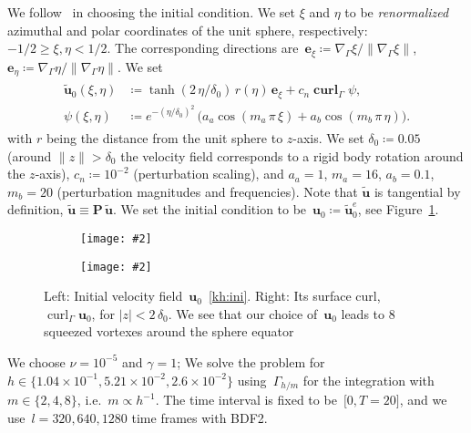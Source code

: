 \documentclass[12pt]{article}
\newcommand{\includegraphicsw}[2][1.]{\texttt{[image: \#2]}}
\newcommand{\vect}[1]{\boldsymbol{\mathbf{#1}}}
\DeclareMathOperator{\Curl}{curl}
\DeclareMathOperator{\vCurl}{\vect{curl}}
\begin{document}
We follow~\cite{lederer2019divergence} in choosing the initial condition. We set $\xi$ and $\eta$ to be \textit{renormalized} azimuthal and polar coordinates of the unit sphere, respectively: $-1/2 \ge \xi, \eta < 1/2$. The corresponding directions are~$\vect e_\xi \coloneqq \nabla_{\Gamma}\xi/\|\nabla_{\Gamma}\xi\|$, $\vect e_\eta \coloneqq \nabla_{\Gamma}\eta/\|\nabla_{\Gamma}\eta\|$. We set
\begin{align}\begin{split} \label{kh:ini}
	\tilde{\vect u}_0(\xi, \eta) &\coloneqq \tanh(2\,\eta/\delta_0)\,r(\eta)\,\vect e_\xi + c_n\vCurl_\Gamma\psi, \\
	\psi(\xi, \eta) &\coloneqq e^{-(\eta/\delta_0)^2}\,\big(a_a\cos(m_a\,\pi\,\xi) + a_b\cos(m_b\,\pi\,\eta)\big).
\end{split}\end{align}
with $r$ being the distance from the unit sphere to $z$-axis. We set $\delta_0 \coloneqq 0.05$ (around $\|z\| > \delta_0$ the velocity field corresponds to a rigid body rotation around the $z$-axis), $c_n \coloneqq 10^{-2}$ (perturbation scaling), and $a_a = 1$, $m_a = 16$, $a_b = 0.1$, $m_b = 20$ (perturbation magnitudes and frequencies). Note that $\tilde{\vect u}$ is tangential by definition, $\tilde{\vect u} \equiv \vect P\,\tilde{\vect u}$. We set the initial condition to be~$\vect u_0 \coloneqq \tilde{\vect u}_0^e$, see Figure~\ref{fig:kh:ini}.

\begin{figure}[H]
	\par\bigskip
	\centering
	\begin{subfigure}{.35\linewidth}
		\centering
		\includegraphicsw[.95]{{kh_ini_u_8.cropped}.png}
	\end{subfigure}%
	\begin{subfigure}{.65\linewidth}
		\centering
		\includegraphicsw[.95]{{kh_ini_w_8.cropped}.png}
	\end{subfigure}%
	\caption{Left: Initial velocity field~$\vect u_0$~\eqref{kh:ini}. Right: Its surface curl, $\Curl_\Gamma \vect u_0$, for $|z| < 2\,\delta_0$. We see that our choice of~$\vect u_0$ leads to 8 squeezed vortexes around the sphere equator}
	\label{fig:kh:ini}		
\end{figure}

We choose $\nu = 10^{-5}$ and $\gamma = 1$; We solve the problem for~$h \in \{1.04\times 10^{-1}, 5.21\times 10^{-2}, 2.6\times 10^{-2}\}$ using~$\Gamma_{h/m}$ for the integration with~$m \in \{ 2, 4, 8\}$, i.e.~$m \propto h^{-1}$. The time interval is fixed to be~$\lbrack0, T = 20\rbrack$, and we use~$l = 320, 640, 1280$ time frames with BDF2.
\end{document}
